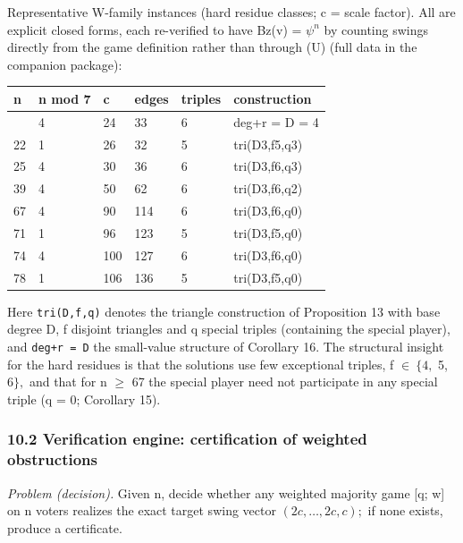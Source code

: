 \documentclass[
]{article}
\newcounter{none} %
\begin{document}
Representative W-family instances (hard residue classes; c = scale
factor). All are explicit closed forms, each re-verified to have Bz(v) =
\(\psi^n\) by counting swings directly from the game definition rather
than through (U) (full data in the companion package):

{\def\LTcaptype{none} %
\begin{longtable}[]{@{}llllll@{}}
\toprule\noalign{}
n & n mod 7 & c & edges & triples & construction \\
\midrule\noalign{}
\endhead
\bottomrule\noalign{}
\endlastfoot
18 & 4 & 24 & 33 & 6 & deg+r = D = 4 \\
22 & 1 & 26 & 32 & 5 & tri(D3,f5,q3) \\
25 & 4 & 30 & 36 & 6 & tri(D3,f6,q3) \\
39 & 4 & 50 & 62 & 6 & tri(D3,f6,q2) \\
67 & 4 & 90 & 114 & 6 & tri(D3,f6,q0) \\
71 & 1 & 96 & 123 & 5 & tri(D3,f5,q0) \\
74 & 4 & 100 & 127 & 6 & tri(D3,f6,q0) \\
78 & 1 & 106 & 136 & 5 & tri(D3,f5,q0) \\
\end{longtable}
}

Here \texttt{tri(D,f,q)} denotes the triangle construction of
Proposition 13 with base degree D, f disjoint triangles and q special
triples (containing the special player), and \texttt{deg+r\ =\ D} the
small-value structure of Corollary 16. The structural insight for the
hard residues is that the solutions use few exceptional triples, f
\(\in\ \{4,\) 5, \(6\},\allowbreak\) and that for n \(\ge\) 67 the
special player need not participate in any special triple (q = 0;
Corollary 15).

\subsubsection{10.2 Verification engine: certification of weighted
obstructions}\label{verification-engine-certification-of-weighted-obstructions}

\emph{Problem (decision).} Given n, decide whether any weighted majority
game {[}q; w{]} on n voters realizes the exact target swing vector
\((2c,\dots,2c,c);\) if none exists, produce a certificate.
\end{document}
